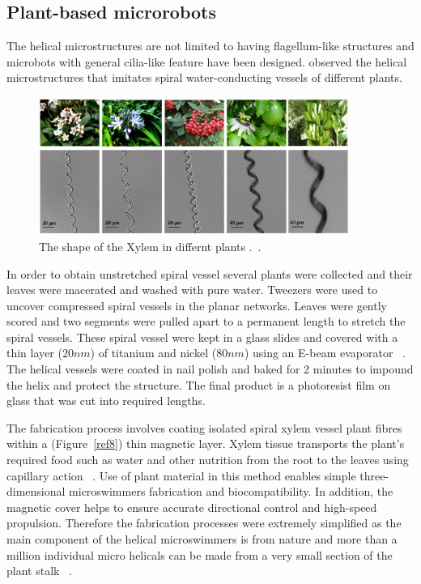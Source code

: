 \documentclass[12pt,a4paper,titlepage]{report}
\newcommand{\hilight}[1]{\colorbox{yellow}{#1}}
\begin{document}
\subsection{Plant-based microrobots}
The helical microstructures are not limited to having flagellum-like structures and microbots with
general cilia-like feature have been designed. \citeauthor{gao2013bioinspired}
 observed the helical microstructures that imitates spiral water-conducting vessels of different plants. 

\begin{figure}
  \centering
    \includegraphics[width=0.9\textwidth]{plants}
  \caption{The shape of the Xylem in differnt plants .~\citep{mahoney2011velocity}.}
  \label{plants}
\end{figure}

In order to obtain unstretched spiral vessel several plants were collected and their leaves were 
macerated and washed with pure water. Tweezers were used to uncover compressed spiral vessels 
in the planar networks. Leaves were gently scored and two segments were pulled apart to a permanent
 length to stretch the spiral vessels. These spiral vessel were kept in a glass slides and covered with a 
thin layer ($20 nm$) of titanium and nickel ($80 nm$) using an 
E-beam evaporator ~\citep{mahoney2011velocity}. The helical vessels were coated in nail 
polish and baked for 2 minutes to impound the helix and protect the structure. The final product is 
a photoresist film on glass that was cut into required lengths.      
  

The fabrication process involves coating isolated spiral xylem vessel plant fibres within a (Figure~\ref{ref8})
thin magnetic layer. Xylem tissue transports the plant\rq{}s required food such as water and other 
nutrition from the root to the leaves using capillary action ~\citep{mahoney2011velocity}.
Use of plant material in this method enables simple three-dimensional microswimmers fabrication 
and biocompatibility. In addition, the magnetic cover helps to ensure accurate directional control and 
high-speed propulsion. Therefore the fabrication processes were extremely simplified as the main 
component of the helical microswimmers is from nature and more than a million individual micro helicals 
can be made from a very small section of the plant stalk ~\citep{mahoney2011velocity}. 
\end{document}
